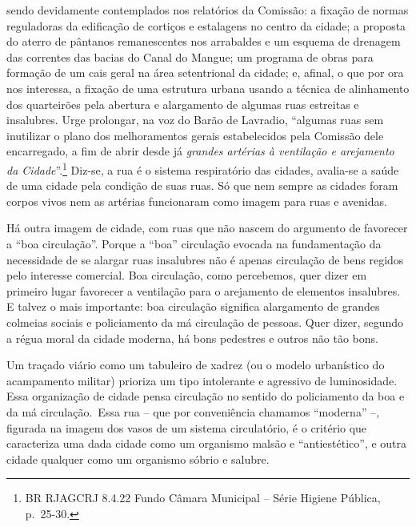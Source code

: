 sendo devidamente contemplados nos relatórios da Comissão: a fixação de
normas reguladoras da edificação de cortiços e estalagens no centro da
cidade; a proposta do aterro de pântanos remanescentes nos arrabaldes e
um esquema de drenagem das correntes das bacias do Canal do Mangue; um
programa de obras para formação de um cais geral na área setentrional da
cidade; e, afinal, o que por ora nos interessa, a fixação de uma
estrutura urbana usando a técnica de alinhamento dos quarteirões pela
abertura e alargamento de algumas ruas estreitas e insalubres. Urge
prolongar, na voz do Barão de Lavradio, ``algumas ruas sem inutilizar o
plano dos melhoramentos gerais estabelecidos pela Comissão dele
encarregado, a fim de abrir desde já \emph{grandes artérias à ventilação
e arejamento da Cidade}''.\footnote{BR RJAGCRJ 8.4.22 Fundo Câmara
  Municipal -- Série Higiene Pública, p.~25-30.} Diz-se, a rua é o
sistema respiratório das cidades, avalia-se a saúde de uma cidade pela
condição de suas ruas. Só que nem sempre as cidades foram corpos vivos
nem as artérias funcionaram como imagem para ruas e avenidas.

Há outra imagem de cidade, com ruas que não nascem do argumento de
favorecer a ``boa circulação''. Porque a ``boa'' circulação evocada na
fundamentação da necessidade de se alargar ruas insalubres não é apenas
circulação de bens regidos pelo interesse comercial. Boa circulação,
como percebemos, quer dizer em primeiro lugar favorecer a ventilação
para o arejamento de elementos insalubres. E talvez o mais importante:
boa circulação significa alargamento de grandes colmeias sociais e
policiamento da má circulação de pessoas. Quer dizer, segundo a régua
moral da cidade moderna, há bons pedestres e outros não tão bons.

Um traçado viário como um tabuleiro de xadrez (ou o modelo urbanístico
do acampamento militar) prioriza um tipo intolerante e agressivo de
luminosidade. Essa organização de cidade pensa circulação no sentido do
policiamento da boa e da má circulação.~Essa rua -- que por conveniência
chamamos ``moderna'' --, figurada na imagem dos vasos de um sistema
circulatório, é o critério que caracteriza uma dada cidade como um
organismo malsão e ``antiestético'', e outra cidade qualquer como um
organismo sóbrio e salubre.

